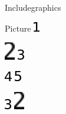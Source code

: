 \documentclass{article}
\begin{document}
\begin{quiz}{Includegraphics}
\begin{matching}[dd]{Picture}
\includegraphics{1 1.PNG}
\item \includegraphics{2 2} \answer \includegraphics{3}
\item \includegraphics{4} \answer \includegraphics{5}
\item \includegraphics{3} \answer \includegraphics{2 2}
\end{matching}

\end{quiz}
\end{document}
